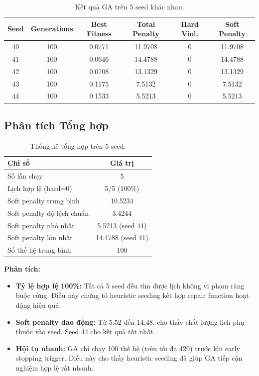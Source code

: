 \begin{table}[H]
    \centering
    \begin{tabular}{|c|c|c|c|c|c|}
        \hline
        \textbf{Seed} & \textbf{Generations} & \textbf{Best Fitness} & \textbf{Total Penalty} & \textbf{Hard Viol.} & \textbf{Soft Penalty} \\ \hline
        40 & 100 & 0.0771 & 11.9708 & 0 & 11.9708 \\ \hline
        41 & 100 & 0.0646 & 14.4788 & 0 & 14.4788 \\ \hline
        42 & 100 & 0.0708 & 13.1329 & 0 & 13.1329 \\ \hline
        43 & 100 & 0.1175 & 7.5132 & 0 & 7.5132 \\ \hline
        44 & 100 & 0.1533 & 5.5213 & 0 & 5.5213 \\ \hline
    \end{tabular}
    \caption{Kết quả GA trên 5 seed khác nhau.}
\end{table}

\subsection{Phân tích Tổng hợp}

\begin{table}[H]
    \centering
    \begin{tabular}{|l|c|}
        \hline
        \textbf{Chỉ số} & \textbf{Giá trị} \\ \hline
        Số lần chạy & 5 \\ \hline
        Lịch hợp lệ (hard=0) & 5/5 (100\%) \\ \hline
        Soft penalty trung bình & 10.5234 \\ \hline
        Soft penalty độ lệch chuẩn & 3.4244 \\ \hline
        Soft penalty nhỏ nhất & 5.5213 (seed 44) \\ \hline
        Soft penalty lớn nhất & 14.4788 (seed 41) \\ \hline
        Số thế hệ trung bình & 100 \\ \hline
    \end{tabular}
    \caption{Thống kê tổng hợp trên 5 seed.}
\end{table}

\textbf{Phân tích:}
\begin{itemize}
    \item \textbf{Tỷ lệ hợp lệ 100\%:} Tất cả 5 seed đều tìm được lịch không vi phạm ràng buộc cứng. Điều này chứng tỏ heuristic seeding kết hợp repair function hoạt động hiệu quả.
    \item \textbf{Soft penalty dao động:} Từ 5.52 đến 14.48, cho thấy chất lượng lịch phụ thuộc vào seed. Seed 44 cho kết quả tốt nhất.
    \item \textbf{Hội tụ nhanh:} GA chỉ chạy 100 thế hệ (trên tối đa 420) trước khi early stopping trigger. Điều này cho thấy heuristic seeding đã giúp GA tiếp cận nghiệm hợp lệ rất nhanh.
\end{itemize}

